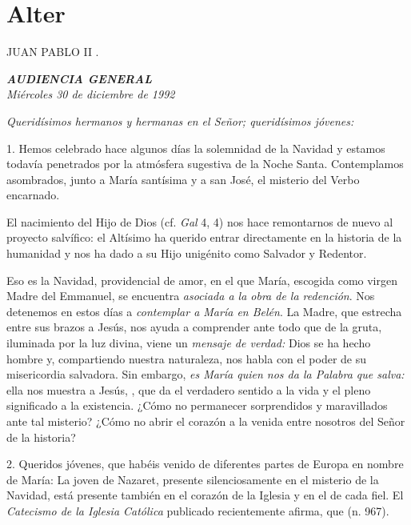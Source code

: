 \section{Alter} JUAN PABLO II .

\emph{\textbf{AUDIENCIA GENERAL}}\\[2\baselineskip]\emph{Miércoles 30 de diciembre de 1992}

 

\emph{Queridísimos hermanos y hermanas en el Señor; queridísimos jóvenes:}

1. Hemos celebrado hace algunos días la solemnidad de la Navidad y estamos todavía penetrados por la atmósfera sugestiva de la Noche Santa. Contemplamos asombrados, junto a María santísima y a san José, el misterio del Verbo encarnado.

El nacimiento del Hijo de Dios  (cf. \emph{Gal} 4, 4) nos hace remontarnos de nuevo al proyecto salvífico: el Altísimo ha querido entrar directamente en la historia de la humanidad y nos ha dado a su Hijo unigénito como Salvador y Redentor.

Eso es la Navidad,  providencial de amor, en el que María, escogida como virgen Madre del Emmanuel, se encuentra \emph{asociada a la obra de la redención}. Nos detenemos en estos días a \emph{contemplar a María en Belén}. La Madre, que estrecha entre sus brazos a Jesús, nos ayuda a comprender ante todo que de la gruta, iluminada por la luz divina, viene un \emph{mensaje de verdad:} Dios se ha hecho hombre y, compartiendo nuestra naturaleza, nos habla con el poder de su misericordia salvadora. Sin embargo, \emph{es María quien nos da la Palabra que salva:} ella nos muestra a Jesús, , que da el verdadero sentido a la vida y el pleno significado a la existencia. ¿Cómo no permanecer sorprendidos y maravillados ante tal misterio? ¿Cómo no abrir el corazón a la venida entre nosotros del Señor de la historia?

2. Queridos jóvenes, que habéis venido de diferentes partes de Europa en nombre de María: La joven de Nazaret, presente silenciosamente en el misterio de la Navidad, está presente también en el corazón de la Iglesia y en el de cada fiel. El \emph{Catecismo de la Iglesia Católica} publicado recientemente afirma, que  (n. 967).

